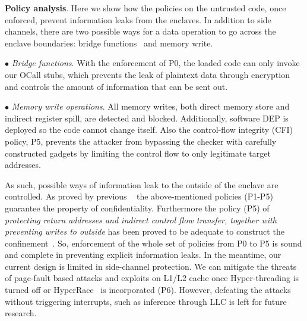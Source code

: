 

\vspace{3pt}\noindent\textbf{Policy analysis}. 
Here we show how the policies on the untrusted code, once enforced, prevent information leaks from the enclaves. In addition to side channels, there are two possible ways for a data operation to go across the enclave boundaries:
bridge functions~\cite{van2019tale} and memory write.

\vspace{2pt}\noindent$\bullet$\textit{ Bridge functions}. 
With the enforcement of P0, the loaded code can only invoke our OCall stubs, which prevents the leak of plaintext data through encryption and controls the amount of information that can be sent out.

\vspace{2pt}\noindent$\bullet$\textit{ Memory write operations}. All memory writes, both direct memory store and indirect register spill, are detected and blocked. Additionally, software DEP is deployed so the code cannot change itself.  Also the control-flow integrity (CFI) policy, P5, prevents the attacker from bypassing the checker with carefully constructed gadgets by limiting the control flow to only legitimate target addresses. 

As such, possible ways of information leak to the outside of the enclave are controlled. As proved by previous \DIFdelbegin {}\DIFdelend \DIFaddbegin {}\DIFaddend ~\cite{sinha2015moat,sinha2016design} the above-mentioned policies (P1-P5) guarantee the property of confidentiality. Furthermore the policy (P5) of \textit{protecting return addresses and indirect control flow transfer, together with preventing writes to outside} has been proved to be adequate to construct the confinement~\cite{schuster2015vc3,sinha2016design}. So, enforcement of the whole set of policies from P0 to P5 is sound and complete in preventing explicit information leaks. 
In the meantime, our current design is limited in side-channel protection. We can mitigate the threats of page-fault based attacks and exploits on L1/L2 cache once Hyper-threading is turned off or HyperRace~\cite{chen2018racing} is incorporated (P6). However, defeating the attacks without triggering interrupts, such as inference through LLC is left for future research.  



